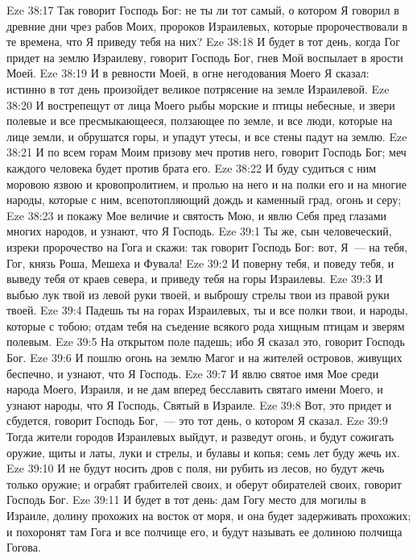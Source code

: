 \vs Eze 38:17 Так говорит Господь Бог: не ты ли тот самый, о котором Я говорил в древние дни чрез рабов Моих, пророков Израилевых, которые пророчествовали в те времена, что Я приведу тебя на них?
\vs Eze 38:18 И будет в тот день, когда Гог придет на землю Израилеву, говорит Господь Бог, гнев Мой воспылает в ярости Моей.
\vs Eze 38:19 И в ревности Моей, в огне негодования Моего Я сказал: истинно в тот день произойдет великое потрясение на земле Израилевой.
\vs Eze 38:20 И вострепещут от лица Моего рыбы морские и птицы небесные, и звери полевые и все пресмыкающееся, ползающее по земле, и все люди, которые на лице земли, и обрушатся горы, и упадут утесы, и все стены падут на землю.
\vs Eze 38:21 И по всем горам Моим призову меч против него, говорит Господь Бог; меч каждого человека будет против брата его.
\vs Eze 38:22 И буду судиться с ним моровою язвою и кровопролитием, и пролью на него и на полки его и на многие народы, которые с ним, всепотопляющий дождь и каменный град, огонь и серу;
\vs Eze 38:23 и покажу Мое величие и святость Мою, и явлю Себя пред глазами многих народов, и узнают, что Я Господь.
\vs Eze 39:1 Ты же, сын человеческий, изреки пророчество на Гога и скажи: так говорит Господь Бог: вот, Я~--- на тебя, Гог, князь Роша, Мешеха и Фувала!
\vs Eze 39:2 И поверну тебя, и поведу тебя, и выведу тебя от краев севера, и приведу тебя на горы Израилевы.
\vs Eze 39:3 И выбью лук твой из левой руки твоей, и выброшу стрелы твои из правой руки твоей.
\vs Eze 39:4 Падешь ты на горах Израилевых, ты и все полки твои, и народы, которые с тобою; отдам тебя на съедение всякого рода хищным птицам и зверям полевым.
\vs Eze 39:5 На открытом поле падешь; ибо Я сказал это, говорит Господь Бог.
\vs Eze 39:6 И пошлю огонь на землю Магог и на жителей островов, живущих беспечно, и узнают, что Я Господь.
\vs Eze 39:7 И явлю святое имя Мое среди народа Моего, Израиля, и не дам вперед бесславить святаго имени Моего, и узнают народы, что Я Господь, Святый в Израиле.
\vs Eze 39:8 Вот, это придет и сбудется, говорит Господь Бог,~--- это тот день, о котором Я сказал.
\vs Eze 39:9 Тогда жители городов Израилевых выйдут, и разведут огонь, и будут сожигать оружие, щиты и латы, луки и стрелы, и булавы и копья; семь лет буду жечь их.
\vs Eze 39:10 И не будут носить дров с поля, ни рубить из лесов, но будут жечь только оружие; и ограбят грабителей своих, и оберут обирателей своих, говорит Господь Бог.
\vs Eze 39:11 И будет в тот день: дам Гогу место для могилы в Израиле, долину прохожих на восток от моря, и она будет задерживать прохожих; и похоронят там Гога и все полчище его, и будут называть ее долиною полчища Гогова.
